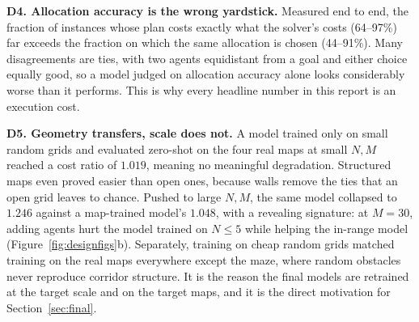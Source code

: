 \documentclass[11pt,a4paper]{article}
\begin{document}
\textbf{D4. Allocation accuracy is the wrong yardstick.} Measured end to end, the fraction of
instances whose plan costs exactly what the solver's costs (64--97\%) far exceeds the fraction on
which the same allocation is chosen (44--91\%). Many disagreements are ties, with two agents
equidistant from a goal and either choice equally good, so a model judged on allocation accuracy
alone looks considerably worse than it performs. This is why every headline number in this report
is an execution cost.

\textbf{D5. Geometry transfers, scale does not.} A model trained only on small random grids and
evaluated zero-shot on the four real maps at small $N,M$ reached a cost ratio of $1.019$, meaning no
meaningful degradation. Structured maps even proved easier than open ones, because walls remove the
ties that an open grid leaves to chance. Pushed to large $N,M$, the same model collapsed to $1.246$
against a map-trained model's $1.048$, with a revealing signature: at $M{=}30$, adding agents hurt
the model trained on $N\le5$ while helping the in-range model (Figure~\ref{fig:designfigs}b).
Separately, training on cheap random grids matched training on the real maps everywhere except the
maze, where random obstacles never reproduce corridor structure. It is the reason the final models are
retrained at the target scale and on the target maps, and it is the direct motivation for
Section~\ref{sec:final}.
\end{document}
